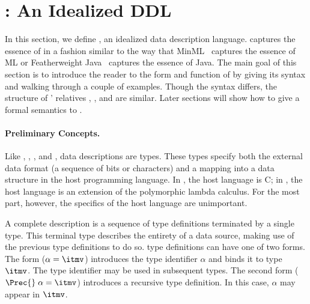 \section{\ipads{}:  An Idealized DDL}
\label{sec:ipads}

In this section, we define \ipads{}, an idealized data description
language.  \ipads{} captures the essence of \pads{} in a fashion
similar to the way that MinML~\cite{harper:plbook} captures the essence of ML or Featherweight
Java~\cite{igarasi+:featherweight} captures the essence of Java.  The main goal of this section is to introduce
the reader to the form and function of \ipads{} by giving its syntax
and walking through a couple of examples.  Though the syntax differs,
the structure of \pads{}' relatives \blt{}, \packettypes{}, and
\datascript{} are similar.  Later sections will show how to give a
formal semantics to \ipads.

\paragraph*{Preliminary Concepts.}
Like \pads{}, \packettypes{}, \datascript{}, and \blt{}, \ipads{} data
descriptions are types.  These types specify both the external data
format (a sequence of bits or characters) and a mapping into a
data structure in the host programming language.  In \pads,
the host language is C; in \ipads, the host language is an extension
of the polymorphic lambda calculus.  For the most part, however, the
specifics of the host language are unimportant.

A complete \ipads{} description is a sequence of type definitions
terminated by a single type.  This terminal type describes the
entirety of a data source, making use of the previous 
type definitions to do so.  \ipads{} type definitions can have one of
two forms.  The form ($\alpha = \itmv$) introduces the type identifier
$\alpha$ and binds it to \ipads{} type $\itmv$.
The type identifier may be used in
subsequent types.  The second form  ($\Prec{}\; \alpha = \itmv$) introduces
a recursive type definition.  In this case, $\alpha$ may appear in 
$\itmv$.

